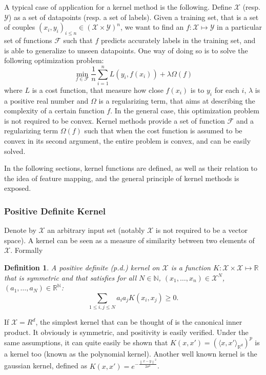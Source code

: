 \documentclass[a4paper, 11pt]{article}
\newtheorem{definition}{Definition}
\newcommand{\X}{\mathcal{X}}
\newcommand{\Y}{\mathcal{Y}}
\newcommand{\F}{\mathcal{F}}
\newcommand{\R}{\mathbb{R}}
\newcommand{\N}{\mathbb{N}}
\newcommand{\x}{x_i}
\newcommand{\y}{y_i}
\newcommand{\inner}[2]{\langle #1 , #2 \rangle_{\R^d}}
\newcommand{\norm}[1]{\left\| #1 \right\|}
\begin{document}
A typical case of application for a kernel method is the following. Define
$\X$ (resp. $\Y$) as a set of datapoints (resp. a set of labels). Given
a training set, that is a set of couples $(\x, \y)_{i\leq n} \in (\X \times \Y)^n$,
we want to find an $f : \X \mapsto \Y$ in a particular set of functions $\F$ such
that $f$ predicts accurately labels in the training set, and is able to generalize
to unseen datapoints. One way of doing so is to solve the following optimization
problem:
\begin{equation}
  \min\limits_{f\in\F} \frac{1}{n}\sum\limits_{i=1}^nL(\y,f(\x)) + \lambda\Omega(f)
  \label{eq:min}
\end{equation}
where $L$ is a cost function, that measure how close $f(\x)$ is to $\y$ for
each $i$, $\lambda$ is a positive real number and $\Omega$ is a regularizing
term, that aims at describing the complexity of a certain function $f$. In the
general case, this optimization problem is not required to be convex. Kernel
methods provide a set of function $\F$ and a regularizing term $\Omega(f)$ such
that when the cost function is assumed to be convex in its second argument, the entire problem is
convex, and can be easily solved.

In the following sections, kernel functions are defined, as well as their
relation to the idea of feature mapping, and the general principle of kernel
methods is exposed.

\subsubsection{Positive Definite Kernel}
\label{subsub:psd}
Denote by $\X$ an arbitrary input set (notably $\X$ is not required to be a vector
space). A kernel can be seen as a measure of similarity between two elements of $\X$.
Formally
\begin{definition}
  A positive definite (p.d.) kernel on $\X$ is a function $K:\X\times\X \mapsto \R$ that
  is symmetric and that satisfies for all $N \in \N$, $(x_1, \dots, x_n) \in \X^N$,
  $(a_1, \dots, a_N) \in \R^\N$:
  \begin{equation}
    \sum\limits_{1 \leq i, j \leq N}a_ia_jK(x_i,x_j) \geq 0.
  \end{equation}
\end{definition}
If $\X = R^d$, the simplest kernel that can be thought of
is the canonical inner product. It obviously is symmetric, 
and positivity is easily verified. 
Under the same assumptions, it can quite easily be shown
that $K(x, x') = (\inner{x}{x'})^p$ is a kernel too (known
as the polynomial kernel). Another well known kernel is 
the gaussian kernel, defined as $K(x, x') = e^{- \frac{\norm{x-y}^2}{2\sigma^2}}$.
\end{document}
